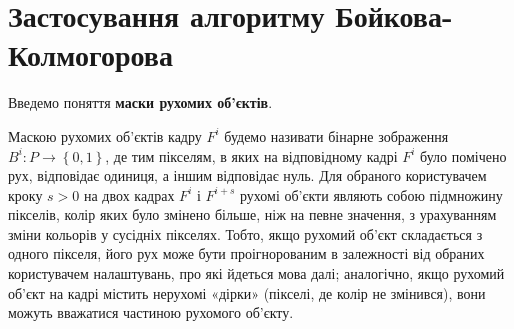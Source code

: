 \section{Застосування алгоритму Бойкова-Колмогорова}

Введемо поняття \textbf{маски рухомих об'єктів}.

Маскою рухомих об'єктів кадру \(F^{i}\) будемо називати бінарне
зображення \(B^{i}:P \rightarrow \left\{ 0,1 \right\}\), де тим
пікселям, в яких на відповідному кадрі \(F^{i}\) було помічено рух,
відповідає одиниця, а іншим відповідає нуль. Для обраного користувачем
кроку \(s > 0\) на двох кадрах \(F^{i}\) і \(F^{i + s}\) рухомі об'єкти
являють собою підмножину пікселів, колір яких було змінено більше, ніж
на певне значення, з урахуванням зміни кольорів у сусідніх пікселях.
Тобто, якщо рухомий об'єкт складається з одного пікселя, його рух може
бути проігнорованим в залежності від обраних користувачем налаштувань,
про які йдеться мова далі; аналогічно, якщо рухомий об'єкт на кадрі
містить нерухомі «дірки» (пікселі, де колір не змінився), вони можуть
вважатися частиною рухомого об'єкту.

